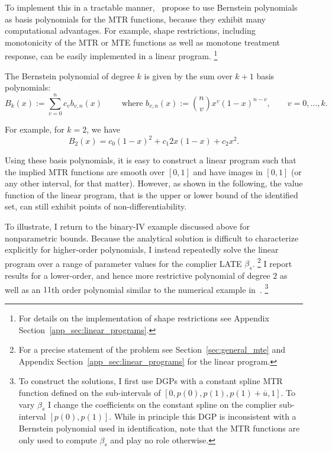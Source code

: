 \documentclass[12pt,a4paper,english]{article} %
\numberwithin{equation}{section}
\theoremstyle{definition}
\theoremstyle{remark}
\theoremstyle{plain}
\begin{document}
To implement this in a tractable manner,~\cite{mogstad2018using} propose to use Bernstein polynomials as basis polynomials for the MTR functions, because they exhibit many computational advantages.
For example, shape restrictions, including monotonicity of the MTR or MTE functions as well as monotone treatment response, can be easily implemented in a linear program.
\footnote{For details on the implementation of shape restrictions see Appendix Section~\ref{app_sec:linear_programs}.}

The Bernstein polynomial of degree $k$ is given by the sum over $k+1$ basis polynomials:
\begin{equation*}
  B_k(x) := \sum_{v=0}^n c_v b_{v,n}(x) \qquad \text{ where } b_{v,n}(x) := \binom{n}{v} x^v(1-x)^{n-v}, \qquad v = 0, \ldots, k.
\end{equation*}

For example, for $k=2$, we have
\begin{equation*}
  B_2(x) = c_0 (1-x)^2 + c_1 2x(1-x) + c_2 x^2.
\end{equation*}

Using these basis polynomials, it is easy to construct a linear program such that the implied MTR functions are smooth over $[0,1]$ and have images in $[0,1]$ (or any other interval, for that matter).
However, as shown in the following, the value function of the linear program, that is the upper or lower bound of the identified set, can still exhibit points of non-differentiability.

To illustrate, I return to the binary-IV example discussed above for nonparametric bounds.
Because the analytical solution is difficult to characterize explicitly for higher-order polynomials, I instead repeatedly solve the linear program over a range of parameter values for the complier LATE $\beta_s$.
\footnote{For a precise statement of the problem see Section~\ref{sec:general_mte} and Appendix Section~\ref{app_sec:linear_programs} for the linear program.}
I report results for a lower-order, and hence more restrictive polynomial of degree $2$ as well as an $11$th order polynomial similar to the numerical example in~\cite{mogstad2018using}.
\footnote{
  To construct the solutions, I first use DGPs with a constant spline MTR function defined on the sub-intervals of $[0, p(0), p(1), p(1) + \overline{u}, 1]$.
  To vary $\beta_s$ I change the coefficients on the constant spline on the complier sub-interval $[p(0), p(1)]$.
  While in principle this DGP is inconsistent with a Bernstein polynomial used in identification,
  note that the MTR functions are only used to compute $\beta_s$ and play no role otherwise.
}
\end{document}
